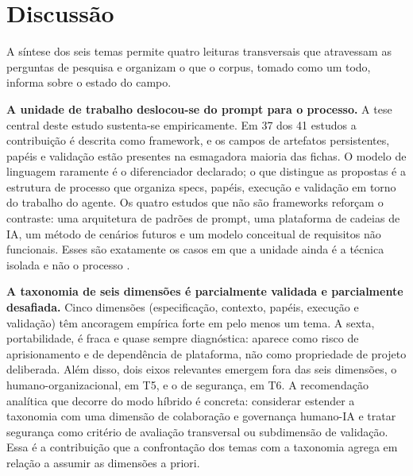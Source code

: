 \section{Discussão}

A síntese dos seis temas permite quatro leituras transversais que atravessam as perguntas de pesquisa e organizam o que o corpus, tomado como um todo, informa sobre o estado do campo.

\noindent\textbf{A unidade de trabalho deslocou-se do prompt para o processo.} A tese central deste estudo sustenta-se empiricamente. Em 37 dos 41 estudos a contribuição é descrita como framework, e os campos de artefatos persistentes, papéis e validação estão presentes na esmagadora maioria das fichas. O modelo de linguagem raramente é o diferenciador declarado; o que distingue as propostas é a estrutura de processo que organiza specs, papéis, execução e validação em torno do trabalho do agente. Os quatro estudos que não são frameworks reforçam o contraste: uma arquitetura de padrões de prompt, uma plataforma de cadeias de IA, um método de cenários futuros e um modelo conceitual de requisitos não funcionais. Esses são exatamente os casos em que a unidade ainda é a técnica isolada e não o processo \cite{JulesWhite2023,YuCheng2023,JSauvola2024,Zabardast2025}.

\noindent\textbf{A taxonomia de seis dimensões é parcialmente validada e parcialmente desafiada.} Cinco dimensões (especificação, contexto, papéis, execução e validação) têm ancoragem empírica forte em pelo menos um tema. A sexta, portabilidade, é fraca e quase sempre diagnóstica: aparece como risco de aprisionamento e de dependência de plataforma, não como propriedade de projeto deliberada. Além disso, dois eixos relevantes emergem fora das seis dimensões, o humano-organizacional, em T5, e o de segurança, em T6. A recomendação analítica que decorre do modo híbrido é concreta: considerar estender a taxonomia com uma dimensão de colaboração e governança humano-IA e tratar segurança como critério de avaliação transversal ou subdimensão de validação. Essa é a contribuição que a confrontação dos temas com a taxonomia agrega em relação a assumir as dimensões a priori.

